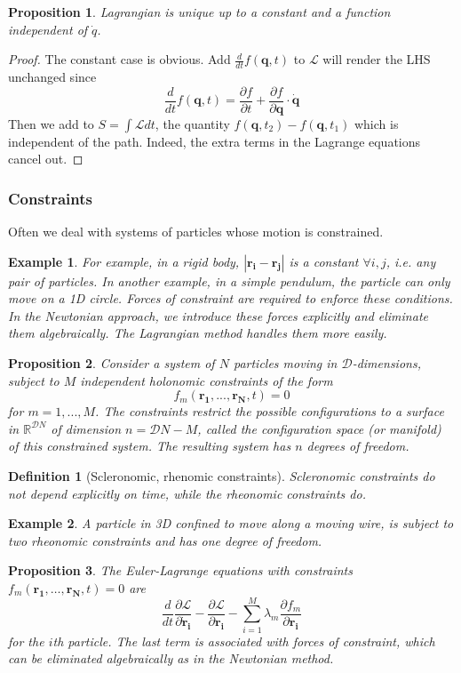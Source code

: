 \documentclass[a4paper]{article}
\newtheorem{defi}{Definition}[section]
\newtheorem{eg}{Example}[section]
\newtheorem{prop}{Proposition}[section]
\theoremstyle{new}
\begin{document}
\begin{prop}
Lagrangian is unique up to a constant and a function independent of $\dot{q}$.
\end{prop}
\begin{proof}
The constant case is obvious. Add $\frac{d}{dt}f(\mathbf{q},t)$ to $\mathcal{L}$ will render the LHS unchanged since 
$$\frac{d}{dt}f(\mathbf{q},t)=\frac{\partial f}{\partial t}+\frac{\partial f}{\partial\mathbf{q}}\cdot\mathbf{\dot{q}}$$
Then we add to $S=\int\mathcal{L}dt$, the quantity $f(\mathbf{q},t_2)-f(\mathbf{q},t_1)$ which is independent of the path. Indeed, the extra terms in the Lagrange equations cancel out.
\end{proof}
\subsubsection{Constraints}
Often we deal with systems of particles whose motion is constrained. 
\begin{eg}
For example, in a rigid body, $|\mathbf{r_i}-\mathbf{r_j}|$ is a constant $\forall i,j$, i.e. any pair of particles. In another example, in a simple pendulum, the particle can only move on a 1D circle. Forces of constraint are required to enforce these conditions. In the Newtonian approach, we introduce these forces explicitly and eliminate them algebraically. The Lagrangian method handles them more easily.
\end{eg}
\begin{prop}
Consider a system of $N$ particles moving in $\mathcal{D}$-dimensions, subject to $M$ independent holonomic constraints of the form 
$$f_m(\mathbf{r_1},...,\mathbf{r_N},t)=0$$
for $m=1,...,M$. The constraints restrict the possible configurations to a surface in $\mathbb{R}^{\mathcal{D}N}$ of dimension $n=\mathcal{D}N-M$, called the configuration space (or manifold) of this constrained system. The resulting system has $n$ degrees of freedom.
\end{prop}
\begin{defi}[Scleronomic, rhenomic constraints]
Scleronomic constraints do not depend explicitly on time, while the rheonomic constraints do. 
\end{defi}
\begin{eg}
A particle in 3D confined to move along a moving wire, is subject to two rheonomic constraints and has one degree of freedom. 
\end{eg}
\begin{prop}
The Euler-Lagrange equations with constraints $f_m(\mathbf{r_1},\dots,\mathbf{r_N},t)=0$ are
$$\frac{d}{dt}\frac{\partial\mathcal{L}}{\partial\mathbf{\dot{r}_i}}-\frac{\partial\mathcal{L}}{\partial\mathbf{r_i}}-\sum_{i=1}^M\lambda_m\frac{\partial f_m}{\partial\mathbf{r_i}}$$
for the $i$th particle. The last term is associated with forces of constraint, which can be eliminated algebraically as in the Newtonian method.
\end{prop}
\end{document}
